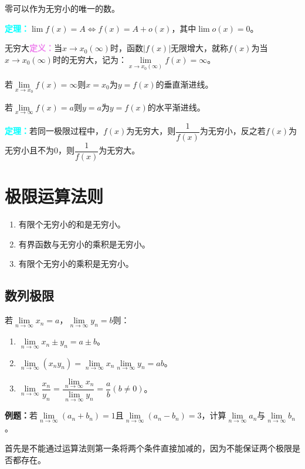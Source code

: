 \documentclass[UTF8, 12pt]{ctexart}
\begin{document}
零可以作为无穷小的唯一的数。

\textcolor{aqua}{\textbf{定理：}}$\lim f(x)=A\Leftrightarrow f(x)=A+o(x)$，其中$\lim o(x)=0$。

无穷大\textcolor{violet}{\textbf{定义：}}当$x\to x_0(\infty)$时，函数$\vert f(x)\vert$无限增大，就称$f(x)$为当$x\to x_0(\infty)$时的无穷大，记为：$\lim\limits_{x\to x_0(\infty)}f(x)=\infty$。

若$\lim\limits_{x\to x_0}f(x)=\infty$则$x=x_0$为$y=f(x)$的垂直渐进线。

若$\lim\limits_{x\to\infty}f(x)=a$则$y=a$为$y=f(x)$的水平渐进线。

\textcolor{aqua}{\textbf{定理：}}若同一极限过程中，$f(x)$为无穷大，则$\dfrac{1}{f(x)}$为无穷小，反之若$f(x)$为无穷小且不为0，则$\dfrac{1}{f(x)}$为无穷大。

\section{极限运算法则}

\begin{enumerate}
    \item 有限个无穷小的和是无穷小。
    \item 有界函数与无穷小的乘积是无穷小。
    \item 有限个无穷小的乘积是无穷小。
\end{enumerate}

\subsection{数列极限}

若$\lim\limits_{n\to\infty}x_n=a$，$\lim\limits_{n\to\infty}y_n=b$则：

\begin{enumerate}
    \item $\lim\limits_{n\to\infty}x_n\pm y_n=a\pm b$。
    \item $\lim\limits_{n\to\infty}(x_ny_n)=\lim\limits_{n\to\infty}x_n\lim\limits_{n\to\infty}y_n=ab$。
    \item $\lim\limits_{n\to\infty}\dfrac{x_n}{y_n}=\dfrac{\lim\limits_{n\to\infty}x_n}{\lim\limits_{n\to\infty}y_n}=\dfrac{a}{b}(b\neq 0)$。
\end{enumerate}

\textbf{例题：}若$\lim\limits_{n\to\infty}(a_n+b_n)=1$且$\lim\limits_{n\to\infty}(a_n-b_n)=3$，计算$\lim\limits_{n\to\infty}a_n$与$\lim\limits_{n\to\infty}b_n$。

首先是不能通过运算法则第一条将两个条件直接加减的，因为不能保证两个极限是否都存在。
\end{document}

